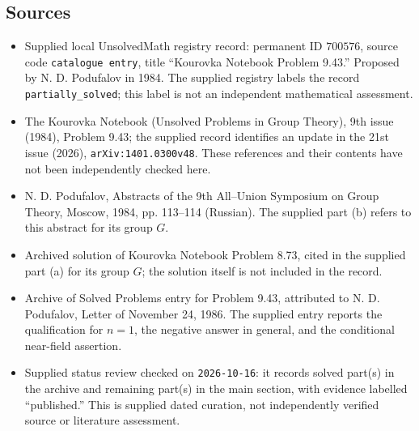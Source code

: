 \documentclass[11pt]{article}
\begin{document}
\subsection{Sources}
\begin{itemize}
\item Supplied local UnsolvedMath registry record: permanent ID \(700576\), source code \texttt{catalogue entry}, title ``Kourovka Notebook Problem 9.43.'' Proposed by N. D. Podufalov in 1984. The supplied registry labels the record \texttt{partially\_solved}; this label is not an independent mathematical assessment.
\item The Kourovka Notebook (Unsolved Problems in Group Theory), 9th issue (1984), Problem 9.43; the supplied record identifies an update in the 21st issue (2026), \texttt{arXiv:1401.0300v48}. These references and their contents have not been independently checked here.
\item N. D. Podufalov, Abstracts of the 9th All--Union Symposium on Group Theory, Moscow, 1984, pp. 113--114 (Russian). The supplied part (b) refers to this abstract for its group \(G\).
\item Archived solution of Kourovka Notebook Problem 8.73, cited in the supplied part (a) for its group \(G\); the solution itself is not included in the record.
\item Archive of Solved Problems entry for Problem 9.43, attributed to N. D. Podufalov, Letter of November 24, 1986. The supplied entry reports the qualification for \(n=1\), the negative answer in general, and the conditional near-field assertion.
\item Supplied status review checked on \texttt{2026-10-16}: it records solved part(s) in the archive and remaining part(s) in the main section, with evidence labelled ``published.'' This is supplied dated curation, not independently verified source or literature assessment.
\end{itemize}
\end{document}
